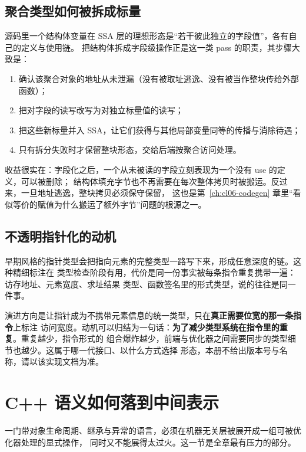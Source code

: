 \documentclass[12pt,a4paper,fontset=fandol]{ctexbook}
\newcommand{\cpp}[1]{C++#1}
\begin{document}
\subsection{聚合类型如何被拆成标量}\label{sec:cl04-scalar-replace}

源码里一个结构体变量在 SSA 层的理想形态是“若干彼此独立的字段值”，各有自己的定义与使用链。
把结构体拆成字段级操作正是这一类 pass 的职责，其步骤大致是：

\begin{enumerate}
  \item 确认该聚合对象的地址从未泄漏（没有被取址逃逸、没有被当作整块传给外部函数）；
  \item 把对字段的读写改写为对独立标量值的读写；
  \item 把这些新标量并入 SSA，让它们获得与其他局部变量同等的传播与消除待遇；
  \item 只有拆分失败时才保留整块形态，交给后端按聚合访问处理。
\end{enumerate}

收益很实在：字段化之后，一个从未被读的字段立刻表现为一个没有 use 的定义，可以被删除；
结构体填充字节也不再需要在每次整体拷贝时被搬运。反过来，一旦地址逃逸，整块拷贝必须保守保留，
这也是第~\ref{ch:cl06-codegen} 章里“看似等价的赋值为什么搬运了额外字节”问题的根源之一。

\subsection{不透明指针化的动机}\label{sec:cl04-opaque-ptr}

早期风格的指针类型会把指向元素的完整类型一路写下来，形成任意深度的链。这种精细标注在
类型检查阶段有用，代价是同一份事实被每条指令重复携带一遍：访存地址、元素宽度、求址结果
类型、函数签名里的形式类型，说的往往是同一件事。

演进方向是让指针成为不携带元素信息的统一类型，只在\textbf{真正需要位宽的那一条指令}上标注
访问宽度。动机可以归结为一句话：\textbf{为了减少类型系统在指令里的重复}。重复越少，指令形式的
组合爆炸越少，前端与优化器之间需要同步的类型细节也越少。这属于哪一代接口、以什么方式选择
形态，本册不给出版本号与名称，请以该实现文档为准。

\section{\cpp{} 语义如何落到中间表示}\label{sec:cl04-cxx-semantics}

一门带对象生命周期、继承与异常的语言，必须在机器无关层被展开成一组可被优化器处理的显式操作，
同时又不能展得太过火。这一节是全章最有压力的部分。
\end{document}
